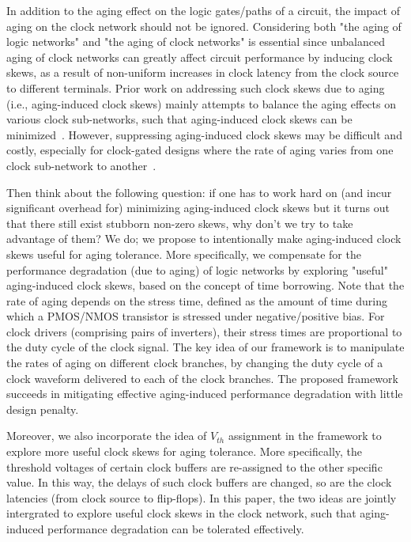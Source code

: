 In addition to the aging effect on the logic gates/paths of a circuit, the impact of aging on the clock network should not be ignored. Considering both "the aging of logic networks" and "the aging of clock networks" is essential since unbalanced aging of clock networks can greatly affect circuit performance by inducing clock skews, as a result of non-uniform increases in clock latency from the clock source to different terminals. Prior work on addressing such clock skews due to aging (i.e., aging-induced clock skews) mainly attempts to balance the aging effects on various clock sub-networks, such that aging-induced clock skews can be minimized~\cite{chen2013novel, huang2013low, chakraborty2013skew}. However, suppressing aging-induced clock skews may be difficult and costly, especially for clock-gated designs where the rate of aging varies from one clock sub-network to another~\cite{lai2014bti}.



Then think about the following question: if one has to work hard on (and incur significant overhead for) minimizing aging-induced clock skews but it turns out that there still exist stubborn non-zero skews, why don't we try to take advantage of them? We do; we propose to intentionally make aging-induced clock skews useful for aging tolerance. More specifically, we compensate for the performance degradation (due to aging) of logic networks by exploring "useful" aging-induced clock skews, based on the concept of time borrowing. Note that the rate of aging depends on the stress time, defined as the amount of time during which a PMOS/NMOS transistor is stressed under negative/positive bias. For clock drivers (comprising pairs of inverters), their stress times are proportional to the duty cycle of the clock signal. The key idea of our framework is to manipulate the rates of aging on different clock branches, by changing the duty cycle of a clock waveform delivered to each of the clock branches. The proposed framework succeeds in mitigating effective aging-induced performance degradation with little design penalty.

Moreover, we also incorporate the idea of $V_{th}$ assignment in the framework to explore more useful clock skews for aging tolerance. More specifically, the threshold voltages of certain clock buffers are re-assigned to the other specific value. In this way, the delays of such clock buffers are changed, so are the clock latencies (from clock source to flip-flops). In this paper, the two ideas are jointly intergrated to explore useful clock skews in the clock network, such that aging-induced performance degradation can be tolerated effectively.